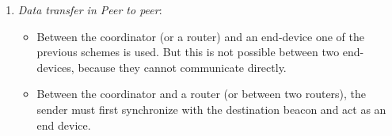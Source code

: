 \begin{enumerate}
\begin{paracol}{2}
      \begin{enumerate}
      \item The coordinator stores the message and signals that the message is pending in the beacon;
      \item The end-device sleeps most of the time and it occasionally listens to the beacon to check for pending messages, and it notices that there is one, it requests the message to the coordinator.
      \item The coordinator sends the pending message in a
      successive slot of the CAP
      \item The device sends a \textit{mandatory} acknowledgment frame in a successive time slot, so that the coordinator may remove the pending message from its list
   \end{enumerate}
\end{paracol}
   \item \textit{Data transfer in Peer to peer}:
   \begin{itemize}
      \item Between the coordinator (or a router) and an end-device one of the previous schemes is used.
      But this is not possible between two end-devices, because they cannot communicate directly.
      \item Between the coordinator and a router (or between two routers), the sender must first synchronize with the destination beacon and
      act as an end device.
   \end{itemize}
\end{enumerate}

\newpage
